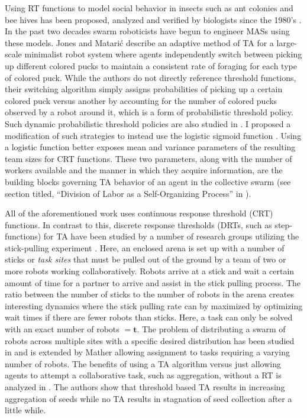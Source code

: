 \documentclass[defaultstyle,12pt]{thesis}
\newcommand{\td}{\mathbf{t}}   %
\begin{document}
Using RT functions to model social behavior in insects such as ant colonies \cite{Bonabeau1996, Bonabeau1997} and bee hives \cite{Robinson1987, Robinson1992, PageJr1990} has been proposed, analyzed and verified by biologists since the 1980's \cite{Theraulaz1998}. In the past two decades swarm roboticists have begun to engineer MASs using these models. Jones and Matari\'c \cite{Jones2004} describe an adaptive method of TA for a large-scale minimalist robot system where agents independently switch between picking up different colored pucks to maintain a consistent rate of foraging for each type of colored puck. While the authors do not directly reference threshold functions, their switching algorithm simply assigns probabilities of picking up a certain colored puck versus another by accounting for the number of colored pucks observed by a robot around it, which is a form of probabilistic threshold policy. Such dynamic probabilistic threshold policies are also studied in \cite{Nouyan2002}. I proposed a modification of such strategies to instead use the logistic sigmoid function \cite{Kanakia2014}. Using a logistic function better exposes mean and variance parameters of the resulting team sizes for CRT functions. These two parameters, along with the number of workers available and the manner in which they acquire information, are the building blocks governing TA behavior of an agent in the collective swarm (see section titled, ``Division of Labor as a Self-Organizing Process'' in \cite{Robinson1992}).

All of the aforementioned work uses continuous response threshold (CRT) functions. In contrast to this, discrete response thresholds (DRTs, such as step-functions) for TA have been studied by a number of research groups utilizing the stick-pulling experiment \cite{Martinoli1995, Martinoli1998, Lerman2001, Martinoli2004}. Here, an enclosed arena is set up with a number of sticks or \emph{task sites} that must be pulled out of the ground by a team of two or more robots working collaboratively. Robots arrive at a stick and wait a certain amount of time for a partner to arrive and assist in the stick pulling process. The ratio between the number of sticks to the number of robots in the arena creates interesting dynamics where the stick pulling rate can by maximized by optimizing wait times if there are fewer robots than sticks. Here, a task can only be solved with an exact number of robots $= \td$. The problem of distributing a swarm of robots across multiple sites with a specific desired distribution has been studied in \cite{Berman2009, Correll2008} and is extended by Mather \cite{Mather2010} allowing assignment to tasks requiring a varying number of robots. The benefits of using a TA algorithm versus just allowing agents to attempt a collaborative task, such as aggregation, without a RT is analyzed in \cite{Agassounon2001}. The authors show that threshold based TA results in increasing aggregation of seeds while no TA results in stagnation of seed collection after a little while. 
\end{document}
